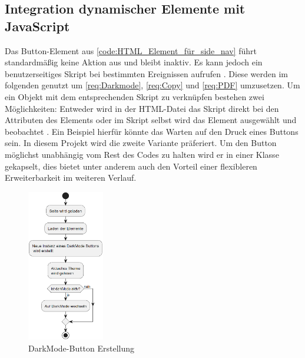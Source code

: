 \documentclass[11pt,a4paper]{report}
\begin{document}
\subsection{Integration dynamischer Elemente mit JavaScript}
Das Button-Element aus \ref{code:HTML_Element_für_side_nav} führt standardmäßig keine Aktion aus und bleibt inaktiv. Es kann jedoch ein benutzerseitiges Skript bei bestimmten Ereignissen aufrufen \cite{Button_Element}. Diese werden im folgenden genutzt um \ref{req:Darkmode}, \ref{req:Copy} und \ref{req:PDF} umzusetzen. Um ein Objekt mit dem entsprechenden Skript zu verknüpfen bestehen zwei Möglichkeiten: Entweder wird in der HTML-Datei das Skript direkt bei den Attributen des Elements oder im Skript selbst wird das Element ausgewählt und \glqq beobachtet \grqq{}. Ein Beispiel hierfür könnte das Warten auf den Druck eines Buttons sein. In diesem Projekt wird die zweite Variante präferiert. Um den Button möglichst unabhängig vom Rest des Codes zu halten wird er in einer Klasse gekapselt, dies bietet unter anderem auch den Vorteil einer flexibleren Erweiterbarkeit im weiteren Verlauf.
\begin{figure}[h]
    \centering
    \includegraphics[width=0.3\textwidth]{images/Ini.png}
    \caption{DarkMode-Button Erstellung}
    \label{fig:DarkMode-ini}
\end{figure}
\end{document}
